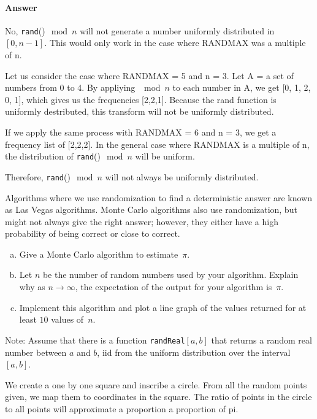 \documentclass{article}
\begin{document}

\paragraph{Answer}
No, \texttt{rand}()$\mod n$ will not generate a number uniformly distributed in
$[0,n-1]$. This would only work in the case where RANDMAX was a multiple of n.

Let us consider the case where RANDMAX = 5 and n = 3. Let A = a set of numbers from
0 to 4. By appliying $\mod n$ to each number in A, we get [0, 1, 2, 0, 1], which
gives us the frequencies [2,2,1]. Because the rand function is uniformly destributed,
this transform will not be uniformly distributed.

If we apply the same process with RANDMAX = 6 and n = 3, we get a frequency list of
[2,2,2]. In the general case where RANDMAX is a multiple of n, the distribution of
\texttt{rand}()$\mod n$ will be uniform.

Therefore, \texttt{rand}()$\mod n$ will not always be uniformly distributed.



\collab{\todo{}}
\nextprob{}

Algorithms where we use randomization to find a deterministic answer are known
as Las Vegas algorithms.  Monte Carlo algorithms also use randomization, but
might not always give the right answer; however, they either have a high
probability of being correct or close to correct.

\begin{enumerate}[(a)]
    \item Give a Monte Carlo algorithm to estimate~$\pi$.
    \item Let $n$ be the number of random numbers used by your algorithm.
        Explain why as $n \to \infty$, the expectation of the output for your
        algorithm is~$\pi$.
    \item Implement this algorithm and plot a line graph of
        the values returned for at least $10$ values of~$n$.
\end{enumerate}

Note: Assume that there is a function \texttt{randReal}$[a,b]$ that returns a random
real number between $a$ and $b$, iid from the uniform distribution over the
interval $[a,b]$.

We create a one by one square and inscribe a circle. From all the random points
given, we map them to coordinates in the square. The ratio of points in the circle
to all points will approximate a proportion a proportion of pi.
\end{document}
